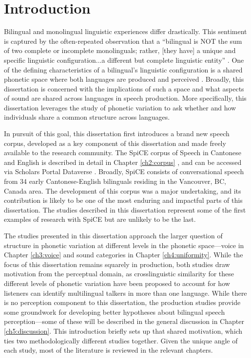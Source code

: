 
\chapter{Introduction}\label{ch1:intro}

Bilingual and monolingual linguistic experiences differ drastically. This sentiment is captured by the often-repeated observation that a ``bilingual is NOT the sum of two complete or incomplete monolinguals; rather, [they have] a unique and specific linguistic configuration...a different but complete linguistic entity'' \citep[][p. 6]{grosjean_1989_bilingual}. One of the defining characteristics of a bilingual's linguistic configuration is a shared phonetic space where both languages are produced and perceived \citep{flege_2021_slmr}. Broadly, this dissertation is concerned with the implications of such a space and what aspects of sound are shared across languages in speech production. More specifically, this dissertation leverages the study of phonetic variation to ask whether and how individuals share a common structure across languages. 

In pursuit of this goal, this dissertation first introduces a brand new speech corpus, developed as a key component of this dissertation and made freely available to the research community. The SpiCE corpus of Speech in Cantonese and English is described in detail in Chapter \ref{ch2:corpus} \citep[based on][]{johnson_2020_spice}, and can be accessed via Scholars Portal Dataverse \citep{johnson_2021_spice}. Broadly, SpiCE consists of conversational speech from 34 early Cantonese-English bilinguals residing in the Vancouver, BC, Canada area. The development of this corpus was a major undertaking, and its contribution is likely to be one of the most enduring and impactful parts of this dissertation. The studies described in this dissertation represent some of the first examples of research with SpiCE but are unlikely to be the last. 

The studies presented in this dissertation approach the larger question of structure in phonetic variation at different levels in the phonetic space---voice in Chapter \ref{ch3:voice} and sound categories in Chapter \ref{ch4:uniformity}. While the focus of this dissertation remains squarely in production, both studies draw motivation from the perceptual domain, as crosslinguistic similarity for these different levels of phonetic variation have been proposed to account for how listeners can identify multilingual talkers in more than one language. While there is no perception component to this dissertation, the production studies provide some groundwork for developing better hypotheses about bilingual speech perception---some of these will be described in the general discussion in Chapter \ref{ch5:discussion}. This introduction briefly sets up that shared motivation, which ties two methodologically different studies together. Given the unique angle of each study, most of the literature is reviewed in the relevant chapters. 

